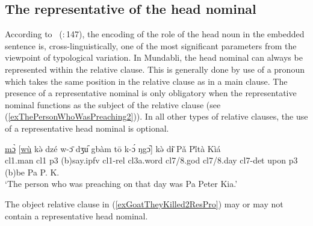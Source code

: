 \documentclass[10pt,twoside]{article}
\newcommand{\gl}[1]{`#1'}
\def\VSP{\vspace{0pt}}
\newcommand{\cl}[1]{{\sc cl#1}}
\newcommand{\citepage}[2]{\citeauthor{#1}~{(\citeyear{#1}:\,{#2})}}
\newcommand{\pref}[1]{(\ref{#1})}
\newcommand{\comment}[1]{\textcolor{blue}{\emph{#1}}}
\begin{document}
\subsection{The representative of the head nominal}\label{secMundabliRepresentativeNominal}
%
%

According to \citepage{Keenan:1985}{147}, the encoding of the role of the head noun in the 
embedded sentence is, cross-linguistically, one of the most significant parameters from 
the viewpoint of typological variation. 
In Mundabli, the head nominal can always be represented within the relative clause. This is generally done by use 
of a pronoun which takes the same position in the relative clause as in a main clause. The presence of 
a representative nominal is only obligatory when the representative nominal functions as the 
subject of the relative clause (see \pref{exThePersonWhoWasPreaching2}).
In all other types of relative clauses, the use of a representative head nominal is optional.

\begin{exe}
	\ex \label{exThePersonWhoWasPreaching2} 		
		\gll \uline{mɔ̀} [\uline{wù} kə̀ dzé w-ɔ̄ dʒu᷇ gbàm tō k-ɔ́ ŋgɔ᷆] kə̀ dɨ̄ Pǎ Pi̋tà Kìá\\
		\cl1.man	\cl1 	{\sc p3}	({\sc b})say.{\sc ipfv}	\cl1-{\sc rel}	\cl3a.word \cl7/8.god	\cl7/8.day	\cl7-{\sc det}	 upon	{\sc p3}	({\sc b})be	Pa P. K. \\
		\glt \VSP \gl{The person who was preaching on that day was Pa Peter Kia.}
\end{exe}%

The object relative clause in \pref{exGoatTheyKilled2ResPro} 
may or may not contain a representative head nominal.
\end{document}
